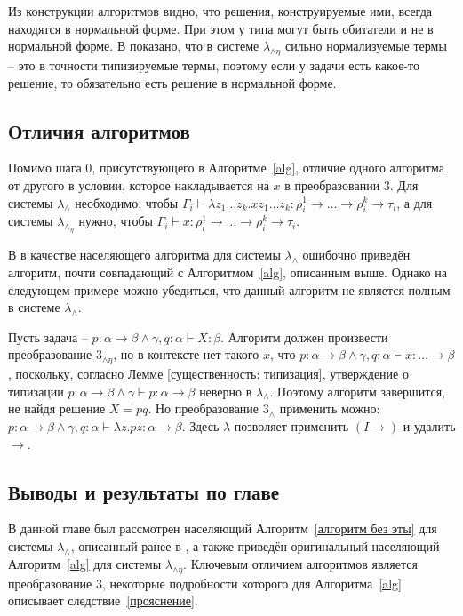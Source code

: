 \documentclass[../main.tex]{subfiles}
\begin{document}
Из конструкции алгоритмов видно, что решения, конструируемые ими, всегда находятся в нормальной форме. При этом у типа могут быть обитатели и не в нормальной форме. В \cite{pottinger_1980} показано, что в системе $\lambda_{\wedge \eta}$ сильно нормализуемые термы -- это в точности типизируемые термы, поэтому если у задачи есть какое-то решение, то обязательно есть решение в нормальной форме.

\subsection{Отличия алгоритмов}

Помимо шага $0$, присутствующего в Алгоритме~\ref{alg}, отличие одного алгоритма от другого в условии, которое накладывается на $x$ в преобразовании $3$. Для системы $\lambda_\wedge$ необходимо, чтобы $\Gamma_i \vdash \lambda z_1 \dots z_k . x z_1 \dots z_k : \rho_i^1 \to \dots \to \rho_i^k \to \tau_i$, а для системы $\lambda_\wedge_\eta$ нужно, чтобы $\Gamma_i \vdash x : \rho_i^1 \to \dots \to \rho_i^k \to \tau_i$.

В \cite{kusmierek_2007} в качестве населяющего алгоритма для системы $\lambda_\wedge$ ошибочно приведён алгоритм, почти совпадающий с Алгоритмом~\ref{alg}, описанным выше. Однако на следующем примере можно убедиться, что данный алгоритм не является полным в системе $\lambda_\wedge$.

Пусть задача -- $p \colon \alpha \to \beta \wedge \gamma, q \colon \alpha \vdash X \colon \beta$. Алгоритм должен произвести преобразование $3_{\wedge \eta}$, но в контексте нет такого $x$, что $p \colon \alpha \to \beta \wedge \gamma, q \colon \alpha \vdash x \colon \dots \to \beta$, поскольку, согласно Лемме \ref{существенность: типизация}, утверждение о типизации $p \colon \alpha \to \beta \wedge \gamma \vdash p \colon \alpha \to \beta$ неверно в $\lambda_\wedge$. Поэтому алгоритм завершится, не найдя решение $X = pq$. 
Но преобразование $3_\wedge$ применить можно: $p \colon \alpha \to \beta \wedge \gamma, q \colon \alpha \vdash \lambda z . pz \colon \alpha \to \beta$. Здесь $\lambda$ позволяет применить $(I \to)$ и удалить $\to$.

\subsection{Выводы и результаты по главе}

В данной главе был рассмотрен населяющий Алгоритм~\ref{алгоритм без эты} для системы $\lambda_\wedge$, описанный ранее в \cite{kusmierek_2007}, а также приведён оригинальный населяющий Алгоритм~\ref{alg} для системы $\lambda_{\wedge \eta}$. Ключевым отличием алгоритмов является преобразование $3$, некоторые подробности которого для Алгоритма~\ref{alg} описывает следствие~\ref{прояснение}.
\end{document}
